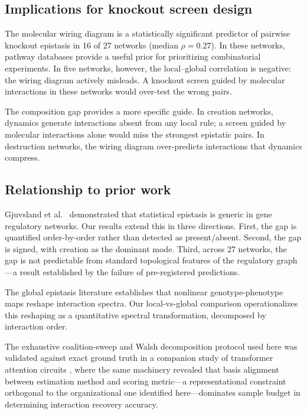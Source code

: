 \documentclass[10pt,letterpaper]{article}
\begin{document}
\subsection*{Implications for knockout screen design}

The molecular wiring diagram is a statistically significant predictor
of pairwise knockout epistasis in 16 of 27 networks (median
$\rho = 0.27$). In these networks, pathway databases provide a
useful prior for prioritizing combinatorial experiments. In five
networks, however, the local--global correlation is negative: the
wiring diagram actively misleads. A knockout screen guided by
molecular interactions in these networks would over-test the
wrong pairs.

The composition gap provides a more specific guide. In creation
networks, dynamics generate interactions absent from any local rule;
a screen guided by molecular interactions alone would miss the
strongest epistatic pairs. In destruction networks, the wiring diagram
over-predicts interactions that dynamics compress.

\subsection*{Relationship to prior work}

Gjuvsland et al.\ \cite{gjuvsland2007statistical} demonstrated that
statistical epistasis is generic in gene regulatory networks. Our
results extend this in three directions. First, the gap is quantified
order-by-order rather than detected as present/absent. Second, the
gap is signed, with creation as the dominant mode. Third, across 27
networks, the gap is not predictable from standard topological
features of the regulatory graph---a result established by the
failure of pre-registered predictions.

The global epistasis literature \cite{otwinowski2018inferring, reddy2021global}
establishes that nonlinear genotype-phenotype maps
reshape interaction spectra. Our local-vs-global comparison
operationalizes this reshaping as a quantitative spectral
transformation, decomposed by interaction order.

The exhaustive coalition-sweep and Walsh decomposition protocol used
here was validated against exact ground truth in a companion study
of transformer attention circuits \cite{tower2026epistasis},
where the same machinery revealed that basis alignment
between estimation method and scoring metric---a representational
constraint orthogonal to the organizational one identified
here---dominates sample budget in determining interaction recovery
accuracy.
\end{document}
